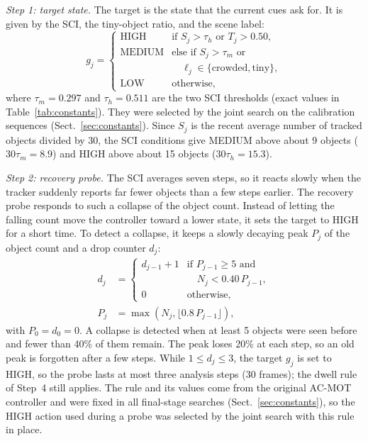 \documentclass[pdflatex,sn-mathphys-num,iicol]{sn-jnl}
\begin{document}
\emph{Step 1: target state.} The target is the state that the current cues
ask for. It is given by the SCI, the tiny-object ratio, and the scene label:
\begin{equation}
g_j=\begin{cases}
\text{HIGH}   & \text{if } S_j>\tau_h \text{ or } T_j>0.50,\\
\text{MEDIUM} & \text{else if } S_j>\tau_m \text{ or}\\
              & \quad \ell_j\in\{\text{crowded},\text{tiny}\},\\
\text{LOW}    & \text{otherwise,}
\end{cases}
\label{eq:target}
\end{equation}
where $\tau_m=0.297$ and $\tau_h=0.511$ are the two SCI thresholds (exact
values in Table~\ref{tab:constants}). They were selected by the joint search
on the calibration sequences (Sect.~\ref{sec:constants}). Since $S_j$ is the
recent average number of tracked objects divided by 30, the SCI conditions
give MEDIUM above about 9 objects ($30\tau_m=8.9$) and HIGH above about 15
objects ($30\tau_h=15.3$).

\emph{Step 2: recovery probe.} The SCI averages seven steps, so it reacts
slowly when the tracker suddenly reports far fewer objects than a few steps
earlier. The recovery probe responds to such a collapse of the object count.
Instead of letting the falling count move the controller toward a lower
state, it sets the target to HIGH for a short time. To detect a collapse, it
keeps a slowly decaying peak $P_j$ of the object count and a drop counter
$d_j$:
\begin{align}
d_j&=\begin{cases}
d_{j-1}+1 & \text{if } P_{j-1}\ge5 \text{ and}\\
          & \quad N_j<0.40\,P_{j-1},\\
0         & \text{otherwise,}
\end{cases}\label{eq:drop}\\
P_j&=\max\left(N_j,\lfloor 0.8\,P_{j-1}\rfloor\right),\label{eq:peak}
\end{align}
with $P_0=d_0=0$. A collapse is detected when at least 5 objects were seen
before and fewer than 40\% of them remain. The peak loses 20\% at each step,
so an old peak is forgotten after a few steps. While $1\le d_j\le3$, the
target $g_j$ is set to HIGH, so the probe lasts at most three analysis steps
(30 frames); the dwell rule of Step~4 still applies. The rule and its values
come from the original AC-MOT controller and were fixed in all final-stage
searches (Sect.~\ref{sec:constants}), so the HIGH action used during a probe
was selected by the joint search with this rule in place.
\end{document}
